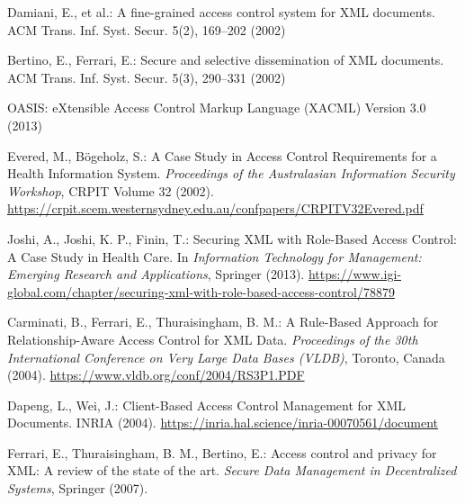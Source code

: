 \documentclass[runningheads]{llncs}
\begin{document}
\begin{thebibliography}{9}

    Damiani, E., et al.: A fine-grained access control system for XML documents. ACM Trans. Inf. Syst. Secur. 5(2), 169--202 (2002)
    
    Bertino, E., Ferrari, E.: Secure and selective dissemination of XML documents. ACM Trans. Inf. Syst. Secur. 5(3), 290--331 (2002)
    
    OASIS: eXtensible Access Control Markup Language (XACML) Version 3.0 (2013)
    
    Evered, M., Bögeholz, S.: A Case Study in Access Control Requirements for a Health Information System. \textit{Proceedings of the Australasian Information Security Workshop}, CRPIT Volume 32 (2002). \url{https://crpit.scem.westernsydney.edu.au/confpapers/CRPITV32Evered.pdf}
    
    Joshi, A., Joshi, K. P., Finin, T.: Securing XML with Role-Based Access Control: A Case Study in Health Care. In \textit{Information Technology for Management: Emerging Research and Applications}, Springer (2013). \url{https://www.igi-global.com/chapter/securing-xml-with-role-based-access-control/78879}
    
    Carminati, B., Ferrari, E., Thuraisingham, B. M.: A Rule-Based Approach for Relationship-Aware Access Control for XML Data. \textit{Proceedings of the 30th International Conference on Very Large Data Bases (VLDB)}, Toronto, Canada (2004). \url{https://www.vldb.org/conf/2004/RS3P1.PDF}
    
    Dapeng, L., Wei, J.: Client-Based Access Control Management for XML Documents. INRIA (2004). \url{https://inria.hal.science/inria-00070561/document}
    
    Ferrari, E., Thuraisingham, B. M., Bertino, E.: Access control and privacy for XML: A review of the state of the art. \textit{Secure Data Management in Decentralized Systems}, Springer (2007). 
    
\end{thebibliography}
    
\end{document}
